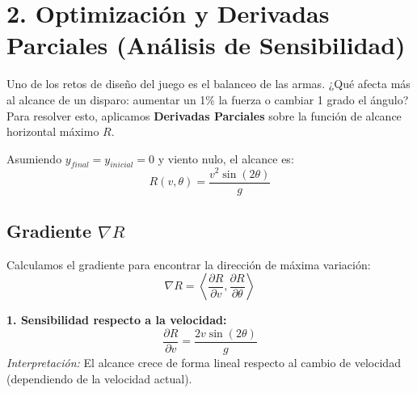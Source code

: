 \documentclass[12pt,a4paper]{article}
\begin{document}
\begin{center}
\end{center}

\section{2. Optimización y Derivadas Parciales (Análisis de Sensibilidad)}
Uno de los retos de diseño del juego es el balanceo de las armas. ¿Qué afecta más al alcance de un disparo: aumentar un 1\% la fuerza o cambiar 1 grado el ángulo?
Para resolver esto, aplicamos \textbf{Derivadas Parciales} sobre la función de alcance horizontal máximo $R$.

Asumiendo $y_{final} = y_{inicial} = 0$ y viento nulo, el alcance es:
\begin{equation}
R(v, \theta) = \frac{v^2 \sin(2\theta)}{g}
\end{equation}

\subsection{Gradiente $\nabla R$}
Calculamos el gradiente para encontrar la dirección de máxima variación:
\begin{equation}
\nabla R = \left\langle \frac{\partial R}{\partial v}, \frac{\partial R}{\partial \theta} \right\rangle
\end{equation}

\textbf{1. Sensibilidad respecto a la velocidad:}
\begin{equation}
\frac{\partial R}{\partial v} = \frac{2v \sin(2\theta)}{g}
\end{equation}
\textit{Interpretación:} El alcance crece de forma lineal respecto al cambio de velocidad (dependiendo de la velocidad actual).
\end{document}
